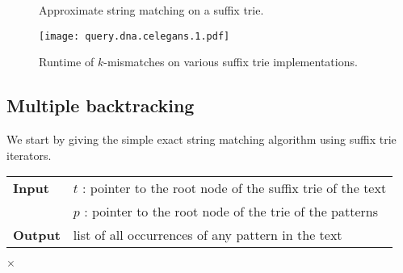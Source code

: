 \begin{figure}[h]
\begin{center}
\caption{Approximate string matching on a suffix trie.}
\label{fig:st-hamming}

\end{center}
\end{figure}

\begin{figure}[h]
\begin{center}
\caption[$k$-mismatches runtime]{Runtime of $k$-mismatches on various suffix trie implementations.}
\label{fig:query-dna-apx}
\texttt{[image: query.dna.celegans.1.pdf]}
\end{center}
\end{figure}


\subsection{Multiple backtracking}

We start by giving the simple exact string matching algorithm using suffix trie iterators.

\begin{center}
\begin{minipage}[t]{.8\textwidth}
\begin{algorithm}[H]
\label{alg:st-exact-multi}
\begin{tabular}{ll}
\textbf{Input}  & $t$ : pointer to the root node of the suffix trie of the text\\
 			    & $p$ : pointer to the root node of the trie of the patterns\\
\textbf{Output} & list of all occurrences of any pattern in the text\\
\end{tabular}
\begin{algorithmic}[1]
	\State \Report {} $\times$ 
\Else
	\State {}
	\Repeat
			\State {}
			\State {}
		\EndIf
\EndIf
\end{algorithmic}
\end{algorithm}
\end{minipage}
\end{center}

